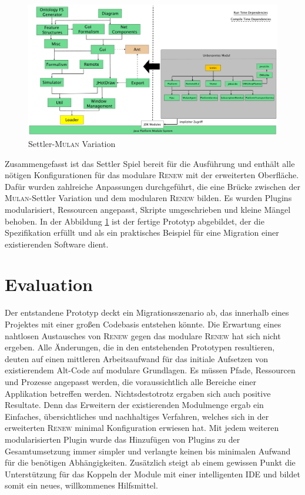 	\begin{figure}[h!]
	  \centering
	  \includegraphics[width=\textwidth]{material/images/settler-renew-mulan-vm.pdf}
	  \caption{Settler-\textsc{Mulan} Variation}
	  \label{fig:mul_prot}
	\end{figure}

	Zusammengefasst ist das Settler Spiel bereit für die Ausführung und enthält alle nötigen Konfigurationen für das modulare \textsc{Renew} mit der erweiterten Oberfläche. Dafür wurden zahlreiche Anpassungen durchgeführt, die eine Brücke zwischen der \textsc{Mulan}-Settler Variation und dem modularen \textsc{Renew} bilden. Es wurden Plugins modularisiert, Ressourcen angepasst, Skripte umgeschrieben und kleine Mängel behoben. \newline
	In der Abbildung \ref{fig:mul_prot} ist der fertige Prototyp abgebildet, der die Spezifikation erfüllt und als ein praktisches Beispiel für eine Migration einer existierenden Software dient. 

\section{Evaluation}
	Der entstandene Prototyp deckt ein Migrationsszenario ab, das innerhalb eines Projektes mit einer großen Codebasis entstehen könnte. Die Erwartung eines nahtlosen Austausches von \textsc{Renew} gegen das modulare \textsc{Renew} hat sich nicht ergeben. Alle Änderungen, die in den entstehenden Prototypen resultieren, deuten auf einen mittleren Arbeitsaufwand für das initiale Aufsetzen von existierendem Alt-Code auf modulare Grundlagen. Es müssen Pfade, Ressourcen und Prozesse angepasst werden, die voraussichtlich alle Bereiche einer Applikation betreffen werden.\newline
	Nichtsdestotrotz ergaben sich auch positive Resultate. Denn das Erweitern der existierenden Modulmenge ergab ein Einfaches, übersichtliches und nachhaltiges Verfahren, welches sich in der erweiterten \textsc{Renew} minimal Konfiguration erwiesen hat. Mit jedem weiteren modularisierten Plugin wurde das Hinzufügen von Plugins zu der Gesamtumsetzung immer simpler und verlangte keinen bis minimalen Aufwand für die benötigen Abhängigkeiten. Zusätzlich steigt ab einem gewissen Punkt die Unterstützung für das Koppeln der Module mit einer intelligenten IDE und bildet somit ein neues, willkommenes Hilfsmittel.
